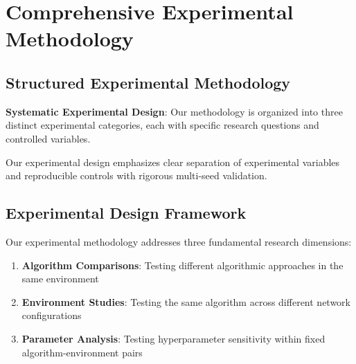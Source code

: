 \documentclass[12pt,twoside]{article}
\theoremstyle{definition}
\theoremstyle{plain}
\begin{document}
\section{Comprehensive Experimental Methodology}

\subsection{Structured Experimental Methodology}

\textbf{Systematic Experimental Design}: Our methodology is organized into three distinct experimental categories, each with specific research questions and controlled variables.

Our experimental design emphasizes clear separation of experimental variables and reproducible controls with rigorous multi-seed validation.

\subsection{Experimental Design Framework}

Our experimental methodology addresses three fundamental research dimensions:

\begin{enumerate}
\item \textbf{Algorithm Comparisons}: Testing different algorithmic approaches in the same environment
\item \textbf{Environment Studies}: Testing the same algorithm across different network configurations  
\item \textbf{Parameter Analysis}: Testing hyperparameter sensitivity within fixed algorithm-environment pairs
\end{enumerate}
\end{document}
